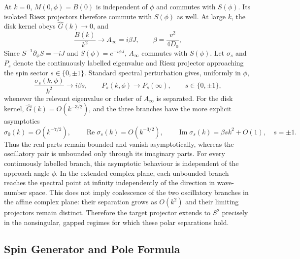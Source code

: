 \documentclass[11pt]{article}
\numberwithin{equation}{section}
\begin{document}
At $k=0$, $M(0,\phi)=B(0)$ is independent of $\phi$ and commutes with
$S(\phi)$. Its isolated Riesz projectors therefore commute with
$S(\phi)$ as well. At large $k$, the disk kernel obeys
$\widehat G(k)\to0$, and
\begin{equation}
  \frac{B(k)}{k^2}\longrightarrow
  A_\infty=i\beta J,
  \qquad
  \beta=\frac{v^2}{4D_0},
  \label{eq:normalized_infinity_matrix}
\end{equation}
Since $S^{-1}\partial_\phi S=-iJ$ and $S(\phi)=e^{-i\phi J}$,
$A_\infty$ commutes with $S(\phi)$. Let $\sigma_s$ and $P_s$ denote the
continuously labelled eigenvalue and Riesz projector approaching the spin
sector $s\in\{0,\pm1\}$. Standard spectral perturbation gives, uniformly in
$\phi$,
\begin{equation}
  \frac{\sigma_s(k,\phi)}{k^2}\longrightarrow i\beta s,
  \qquad
  P_s(k,\phi)\longrightarrow P_s(\infty),
  \qquad s\in\{0,\pm1\},
  \label{eq:normalized_polar_spectrum}
\end{equation}
whenever the relevant eigenvalue or cluster of $A_\infty$ is separated.
For the disk kernel, $\widehat G(k)=O(k^{-3/2})$, and the three branches have
the more explicit asymptotics
\begin{equation}
  \sigma_0(k)=O(k^{-7/2}),\qquad
  \operatorname{Re}\sigma_s(k)=O(k^{-3/2}),\qquad
  \operatorname{Im}\sigma_s(k)=\beta s k^2+O(1),
  \quad s=\pm1.
  \label{eq:unnormalized_polar_spectrum}
\end{equation}
Thus the real parts remain bounded and vanish asymptotically, whereas the
oscillatory pair is unbounded only through its imaginary parts. For every
continuously labelled branch, this asymptotic behaviour is independent of
the approach angle $\phi$. In the extended complex plane, each unbounded
branch reaches the spectral point at infinity independently of the direction
in wave-number space. This does not imply coalescence of the two oscillatory
branches in the affine complex plane: their separation grows as $O(k^2)$ and
their limiting projectors remain distinct. Therefore the target projector
extends to $S^2$ precisely in the nonsingular, gapped regimes for which these
polar separations hold.

\subsection{Spin Generator and Pole Formula}
\end{document}

